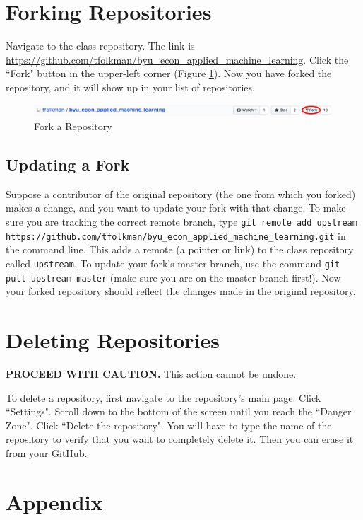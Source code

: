\documentclass[11pt,a4paper]{article}
\begin{document}
\section{Forking Repositories}
Navigate to the class repository. 
The link is \url{https://github.com/tfolkman/byu_econ_applied_machine_learning}.
Click the ``Fork" button in the upper-left corner (Figure \ref{fig:fork}).
Now you have forked the repository, and it will show up in your list of repositories.

\begin{figure}[h!]
\centering
\includegraphics[width=.7\textwidth]{figures/fork.png}
\caption{Fork a Repository}
\label{fig:fork}
\end{figure}

\subsection{Updating a Fork}

Suppose a contributor of the original repository (the one from which you forked) makes a change, and you want to update your fork with that change.
To make sure you are tracking the correct remote branch, type \texttt{git remote add upstream https://github.com/tfolkman/byu\_econ\_applied\_machine\_learning.git} in the command line.
This adds a remote (a pointer or link) to the class repository called \texttt{upstream}.
To update your fork's master branch, use the command \texttt{git pull upstream master} (make sure you are on the master branch first!).
Now your forked repository should reflect the changes made in the original repository.

\section{Deleting Repositories}
\textbf{PROCEED WITH CAUTION.}
This action cannot be undone.

To delete a repository, first navigate to the repository's main page.
Click ``Settings".
Scroll down to the bottom of the screen until you reach the ``Danger Zone".
Click ``Delete the repository".
You will have to type the name of the repository to verify that you want to completely delete it.
Then you can erase it from your GitHub.

\section{Appendix}
\end{document}
